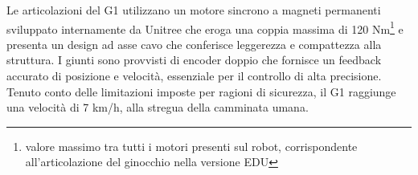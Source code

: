 Le articolazioni del G1 utilizzano un motore sincrono a magneti permanenti sviluppato internamente da Unitree che eroga una coppia massima di 120 Nm\footnote{valore massimo tra tutti i motori presenti sul robot, corrispondente all'articolazione del ginocchio nella versione EDU} e presenta un design ad asse cavo che conferisce leggerezza e compattezza alla struttura. I giunti sono provvisti di encoder doppio che fornisce un feedback accurato di posizione e velocità, essenziale per il controllo di alta precisione. Tenuto conto delle limitazioni imposte per ragioni di sicurezza, il G1 raggiunge una velocità di 7 km/h, alla stregua della camminata umana.
